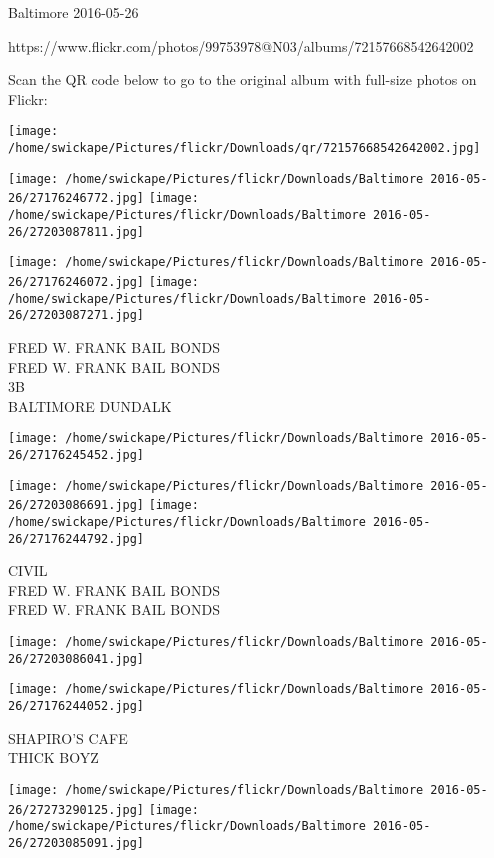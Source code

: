 \documentclass[10pt,letterpaper]{article}
\begin{document}
Baltimore 2016-05-26

https://www.flickr.com/photos/99753978@N03/albums/72157668542642002

Scan the QR code below to go to the original album with full-size photos on Flickr:

\texttt{[image: /home/swickape/Pictures/flickr/Downloads/qr/72157668542642002.jpg]}
\pagebreak

\texttt{[image: /home/swickape/Pictures/flickr/Downloads/Baltimore 2016-05-26/27176246772.jpg]}
\texttt{[image: /home/swickape/Pictures/flickr/Downloads/Baltimore 2016-05-26/27203087811.jpg]}

\texttt{[image: /home/swickape/Pictures/flickr/Downloads/Baltimore 2016-05-26/27176246072.jpg]}
\texttt{[image: /home/swickape/Pictures/flickr/Downloads/Baltimore 2016-05-26/27203087271.jpg]}

FRED W. FRANK BAIL BONDS\\
FRED W. FRANK BAIL BONDS\\
3B\\
BALTIMORE DUNDALK
\pagebreak

\texttt{[image: /home/swickape/Pictures/flickr/Downloads/Baltimore 2016-05-26/27176245452.jpg]}

\vspace{0.25in}
\texttt{[image: /home/swickape/Pictures/flickr/Downloads/Baltimore 2016-05-26/27203086691.jpg]}
\texttt{[image: /home/swickape/Pictures/flickr/Downloads/Baltimore 2016-05-26/27176244792.jpg]}

CIVIL\\
FRED W. FRANK BAIL BONDS\\
FRED W. FRANK BAIL BONDS
\pagebreak

\texttt{[image: /home/swickape/Pictures/flickr/Downloads/Baltimore 2016-05-26/27203086041.jpg]}

\vspace{0.25in}
\texttt{[image: /home/swickape/Pictures/flickr/Downloads/Baltimore 2016-05-26/27176244052.jpg]}

SHAPIRO'S CAFE\\
THICK BOYZ
\pagebreak

\texttt{[image: /home/swickape/Pictures/flickr/Downloads/Baltimore 2016-05-26/27273290125.jpg]}
\texttt{[image: /home/swickape/Pictures/flickr/Downloads/Baltimore 2016-05-26/27203085091.jpg]}
\end{document}

